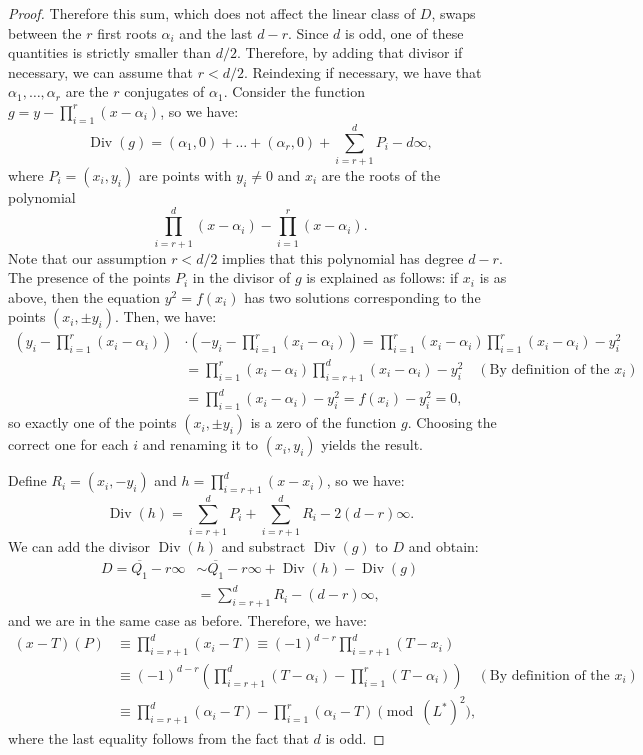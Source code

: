\documentclass[a4paper, 12pt]{amsart}
\theoremstyle{definition}
\theoremstyle{plain}
\theoremstyle{plain}
\theoremstyle{plain}
\theoremstyle{plain}
\theoremstyle{remark}
\theoremstyle{remark}
\theoremstyle{plain}
\DeclareMathOperator{\Div}{Div}
\begin{document}
\begin{proof}
	
	Therefore this sum, which does not affect the linear class of $D$, swaps between the $r$ first roots $\alpha_i$ and the last $d-r$. Since $d$ is odd, one of these quantities is strictly smaller than $d/2$. Therefore, by adding that divisor if necessary, we can assume that $r<d/2$.
	Reindexing if necessary, we have that $\alpha_1,\ldots,\alpha_r$ are the $r$ conjugates of $\alpha_1$. Consider the function $g=y-\prod_{i=1}^r(x-\alpha_i)$, so we have:
	\begin{equation*}
		\Div(g)=(\alpha_1,0)+\ldots+(\alpha_r,0)+\sum_{i=r+1}^d P_i-d\infty,
	\end{equation*}
	where $P_i=(x_i,y_i)$ are points with $y_i\neq 0$ and $x_i$ are the roots of the polynomial
	\begin{equation*}
		\prod_{i=r+1}^d(x-\alpha_i)-\prod_{i=1}^r(x-\alpha_i).
	\end{equation*}
	Note that our assumption $r<d/2$ implies that this polynomial has degree $d-r$. The presence of the points $P_i$ in the divisor of $g$ is explained as follows: if $x_i$ is as above, then the equation $y^2=f(x_i)$ has two solutions corresponding to the points $(x_i,\pm y_i)$. Then, we have:
	\begin{align*}
		\left(y_i-\prod_{i=1}^r(x_i-\alpha_i)\right)&\cdot\left(-y_i-\prod_{i=1}^r(x_i-\alpha_i)\right)=\prod_{i=1}^r(x_i-\alpha_i)\prod_{i=1}^r(x_i-\alpha_i)-y_i^2\\
		&=\prod_{i=1}^r(x_i-\alpha_i)\prod_{i=r+1}^d(x_i-\alpha_i)-y_i^2\quad(\text{By definition of the }x_i)\\
		&=\prod_{i=1}^d(x_i-\alpha_i)-y_i^2=f(x_i)-y_i^2=0,
	\end{align*}
	so exactly one of the points $(x_i,\pm y_i)$ is a zero of the function $g$. Choosing the correct one for each $i$ and renaming it to $(x_i,y_i)$ yields the result.
	
	Define $R_i=(x_i,-y_i)$ and $h=\prod_{i=r+1}^d (x-x_i)$, so we have:
	\begin{equation*}
		\Div(h)=\sum_{i=r+1}^d P_i+\sum_{i=r+1}^d R_i -2(d-r)\infty.
	\end{equation*}
	We can add the divisor $\Div(h)$ and substract $\Div(g)$ to $D$ and obtain:
	\begin{align*}
		D=\overline{Q_1}-r\infty&\sim \overline{Q_1}-r\infty+\Div(h)-\Div(g)\\
		&=\sum_{i=r+1}^d R_i-(d-r)\infty,
	\end{align*}
	and we are in the same case as before. Therefore, we have:
	\begin{align*}
		(x-T)(P)&\equiv \prod_{i=r+1}^d(x_i-T)\equiv (-1)^{d-r}\prod_{i=r+1}^d(T-x_i)\\
		&\equiv(-1)^{d-r}\left(\prod_{i=r+1}^d(T-\alpha_i)-\prod_{i=1}^r(T-\alpha_i)\right)       \quad(\text{By definition of the }x_i)\\
		&\equiv \prod_{i=r+1}^d(\alpha_i-T)-\prod_{i=1}^r(\alpha_i-T) \pmod{(L^*)^2},
	\end{align*}
	where the last equality follows from the fact that $d$ is odd.
	\end{proof}
	
\end{document}
